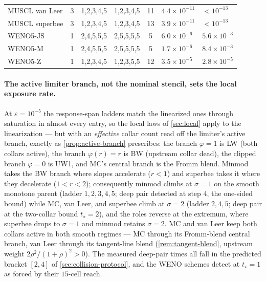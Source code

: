 \documentclass[pdflatex,sn-mathphys-num]{sn-jnl}%
\theoremstyle{thmstyleone}%
\theoremstyle{thmstyletwo}%
\theoremstyle{thmstylethree}%
\begin{document}
\begin{table}[htbp]
\begin{tabular}{@{}lcllcll@{}}
MUSCL van Leer                           & 3                           & 1,2,3,4,5                     & 1,2,3,4,5 & 11 & $4.4\times10^{-11}$ & $<\!10^{-13}$      \\
MUSCL superbee                           & 3                           & 1,2,3,4,5                     & 1,2,3,4,5 & 13 & $3.9\times10^{-11}$ & $<\!10^{-13}$      \\
WENO5-JS                                 & 1                           & 2,4,5,5,5                     & 2,5,5,5,5 & 5  & $6.0\times10^{-6}$  & $5.6\times10^{-3}$ \\
WENO5-M                                  & 1                           & 2,4,5,5,5                     & 2,5,5,5,5 & 5  & $1.7\times10^{-6}$  & $8.4\times10^{-3}$ \\
WENO5-Z                                  & 1                           & 1,2,3,4,5                     & 1,2,3,5,5 & 12 & $3.5\times10^{-5}$  & $2.8\times10^{-5}$ \\
\bottomrule
\end{tabular}
\end{table}

\paragraph{The active limiter branch, not the nominal stencil, sets the local exposure rate.}
At $\varepsilon=10^{-5}$ the response-span ladders match the linearized ones through saturation in almost every entry, so the local laws of \cref{sec:local} apply to the linearization --- but with an \emph{effective} collar count read off the limiter's active branch, exactly as \cref{prop:active-branch} prescribes: the branch $\varphi=1$ is LW (both collars active), the branch $\varphi(r)=r$ is BW (upstream collar dead), the clipped branch $\varphi=0$ is UW1, and MC's central branch is the Fromm blend.
Minmod takes the BW branch where slopes accelerate ($r<1$) and superbee takes it where they decelerate ($1<r<2$); consequently minmod climbs at $\sigma=1$ on the smooth monotone parent (ladder $1,2,3,4,5$; deep pair detected at step $4$, the one-sided bound) while MC, van Leer, and superbee climb at $\sigma=2$ (ladder $2,4,5$; deep pair at the two-collar bound $t_\star=2$), and the roles reverse at the extremum, where superbee drops to $\sigma=1$ and minmod retains $\sigma=2$.
MC and van Leer keep both collars active in both smooth regimes --- MC through its Fromm-blend central branch, van Leer through its tangent-line blend (\cref{rem:tangent-blend}, upstream weight $2\rho^2/(1+\rho)^2>0$).
The measured deep-pair times all fall in the predicted bracket $[2,4]$ of \cref{sec:collision-protocol}, and the WENO schemes detect at $t_\star=1$ as forced by their $15$-cell reach.
\end{document}
